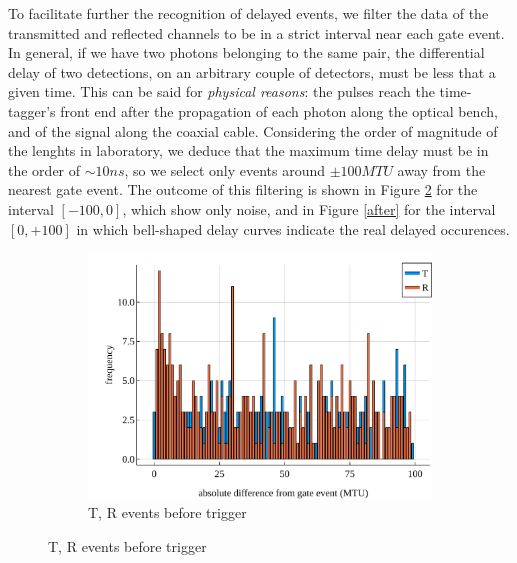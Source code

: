 \documentclass[10pt, final]{article}
\begin{document}
\begin{multicols}{2}
To facilitate further the recognition of delayed events, we filter the data of the transmitted and reflected channels to be in a strict interval near each gate event.
In general, if we have two photons belonging to the same pair, the differential delay of two detections, on an arbitrary couple of detectors, must be less that a given time. This can be said for \emph{physical reasons}: the pulses reach the time-tagger's front end after the propagation of each photon along the optical bench, and of the signal along the coaxial cable. Considering the order of magnitude of the lenghts in laboratory, we deduce that the maximum time delay must be in the order of $\sim 10 ns$, so we select only events around $\pm 100 MTU$ away from the nearest gate event. The outcome of this filtering is shown in Figure \ref{before} for the interval $[-100, 0]$, which show only noise, and in Figure \ref{after} for the interval $[0, +100]$ in which bell-shaped delay curves indicate the real delayed occurences.
\begin{mdframed}
    \begin{figure}[H]
        \begin{subfigure}{\textwidth}
            \centering
            \includegraphics[width = \textwidth]{../images/before.pdf}
            \caption{T, R events before trigger}
            \label{before}
        \end{subfigure}


\end{figure}
\end{mdframed}
\end{multicols}
\end{document}
